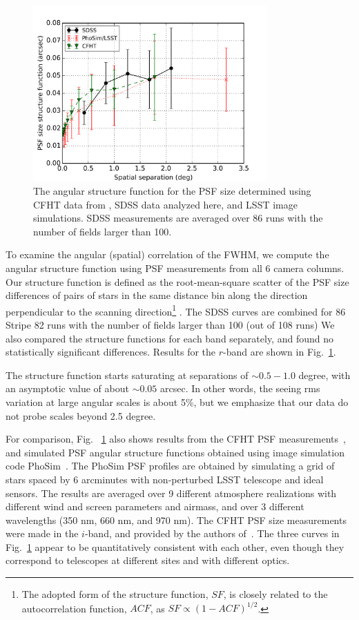 \begin{figure}[th]
\centering
\includegraphics[width=0.8\textwidth]{FIGURES/spatial.png}
\caption{The angular structure function for the PSF size determined using 
  CFHT data from \cite{heymans2012}, SDSS data analyzed here, and LSST image simulations. 
  SDSS measurements are averaged over 86 runs with the number of fields larger than 100. 
\label{fig:spatial}}
\end{figure}

To examine the angular (spatial) correlation of the FWHM, we compute the angular
structure function using PSF measurements from all 6 camera columns.
Our structure function is defined as the root-mean-square scatter of the PSF size 
differences of pairs of stars in the same distance bin along the direction perpendicular
to the scanning direction\footnote{The adopted form 
of the structure function, $SF$, is closely related to the autocorrelation function, $ACF$, as 
$SF \propto (1-ACF)^{1/2}$.} .
The SDSS curves are combined for 86 Stripe 82 runs with the number of fields larger than 
100 (out of 108 runs) 
We also compared the structure functions for each band
separately, and found no statistically significant differences.
Results for the $r$-band are shown in Fig.~\ref{fig:spatial}.

The structure function starts saturating at separations of
$\sim 0.5 - 1.0$ degree, with an asymptotic value of about $\sim 0.05$ arcsec.
In other words, the seeing rms variation at large angular scales is about 5\%,
but we emphasize that our data do not probe scales beyond 2.5 degree. 

For comparison, Fig. ~\ref{fig:spatial} also shows results from the CFHT PSF 
measurements~\citep{heymans2012}, and simulated PSF angular
structure functions obtained using image simulation code PhoSim~\citep{phosim}. 
The PhoSim PSF profiles are obtained by simulating a grid of stars
spaced by 6 arcminutes with non-perturbed LSST telescope and ideal sensors.
The results are averaged over 9 different atmosphere realizations with
different wind and screen parameters and airmass, and over 3 different
wavelengths (350 nm, 660 nm, and 970 nm).
The CFHT PSF size measurements were made in the $i$-band, and provided
by the authors of~\cite{heymans2012}.
The three curves in Fig.~\ref{fig:spatial} appear to be quantitatively
consistent with each other, even though they correspond to telescopes at
different sites and with different optics. 


